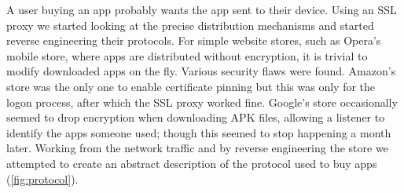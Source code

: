 \documentclass[a4paper]{scrartcl}
\begin{document}
A user buying an app probably wants the app sent to their device.
Using an SSL proxy we started looking at the precise distribution mechanisms and started reverse engineering their protocols.
For simple website stores, such as Opera's mobile store, where apps are distributed without encryption, it is trivial to modify downloaded apps on the fly.
Various security flaws were found.
Amazon's store was the only one to enable certificate pinning but this was only for the logon process, after which the SSL proxy worked fine.
Google's store occasionally seemed to drop encryption when downloading APK files, allowing a listener to identify the apps someone used; though this seemed to stop happening a month later.
Working from the network traffic and by reverse engineering the store we attempted to create an abstract description of the protocol used to buy apps (\autoref{fig:protocol}).
\end{document}
